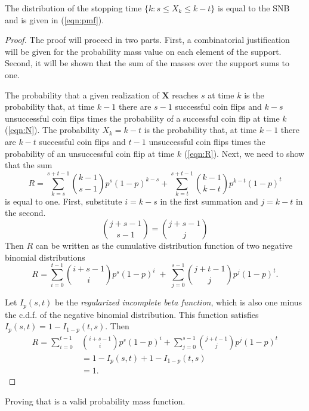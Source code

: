 \documentclass[12pt]{article}         %
\begin{document}
\begin{prop}
The distribution of the stopping time $\{k: s \leq X_k \leq k-t \}$ is equal to the SNB and is given in (\ref{eqn:pmf}). 
\end{prop}
\begin{proof}
The proof will proceed in two parts. First, a combinatorial justification will be given for the probability mass value on each element of the support. Second, it will be shown that the sum of the masses over the support sums to one.

The probability that a given realization of $\mathbf{X}$ reaches $s$ at 
time $k$ is  the probability that, at time $k-1$ there are $s-1$ successful 
coin flips and $k-s$ unsuccessful coin flips times the probability of a 
successful coin flip at time $k$ (\ref{eqn:N}). The probability $X_k = k-t$ 
is the probability that, at time $k-1$ there are $k-t$ successful coin flips 
and $t-1$ unsuccessful coin flips times the probability of an unsuccessful 
coin flip at time $k$ (\ref{eqn:R}).  Next, we need to show that the sum
\begin{equation} \label{eqn:sum_proof}
R = \sum_{k=s}^{s+t-1} {k-1 \choose s-1} p^s (1-p)^{k-s} + \sum_{k=t}^{s+t-1} {k-1 \choose k-t} p^{k-t} (1-p)^t
\end{equation}
is equal to one.
First, substitute $i=k-s$ in the first summation and
$j=k-t$ in the second. 
\begin{equation*}
{j+s-1 \choose s-1} = {j+s-1 \choose j}
\end{equation*}
Then %
$R$ can be written
as the cumulative distribution function of two 
negative binomial distributions
\begin{equation} \label{eqn:transformed_sum}
R = \sum_{i=0}^{t-1} {i+s-1 \choose i} p^s (1-p)^i \; + \;
\sum_{j=0}^{s-1} {j+t-1 \choose j} p^j (1-p)^t.
\end{equation}

Let $I_p(s, t)$ be the {\em regularized incomplete beta function}, which is 
also one minus the c.d.f. of the negative binomial distribution. This
function satisfies $I_p(s, t) = 1-I_{1-p}(t, s)$.  Then 
\begin{align*}
R = \sum_{i=0}^{t-1} &{i+s-1 \choose i} p^s (1-p)^i +
\sum_{j=0}^{s-1}  {j+t-1 \choose j} p^j  (1-p)^t \\
   &= 1-I_p(s, t) + 1 - I_{1-p}(t, s) \\
   &= 1. 
\end{align*}
\end{proof}
Proving that \label{eqn:pmf} is a valid probability mass function.
\end{document}
